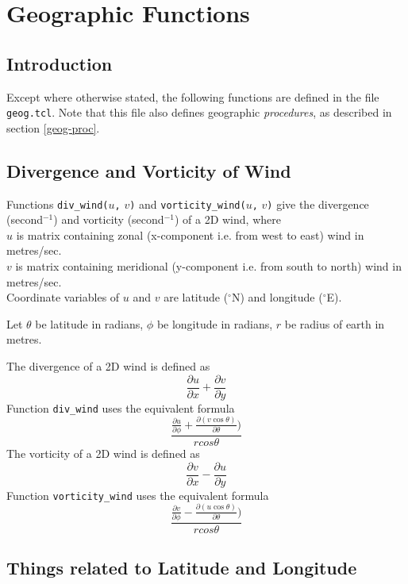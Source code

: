 
\section{Geographic Functions}
    \label{geog}

\subsection{Introduction}
    \label{geog-Introduction}

Except where otherwise stated,
the following functions are defined in the file \texttt{geog.tcl}.
Note that this file also defines 
geographic {\em procedures}, as described in section \ref{geog-proc}.

\subsection{Divergence and Vorticity of Wind}
    \label{geog-Wind}

Functions 
  \texttt{div\_wind(}$u$\texttt{,} $v$\texttt{)}
and 
  \texttt{vorticity\_wind(}$u$\texttt{,} $v$\texttt{)}
give the divergence (second$^{-1}$) and vorticity (second$^{-1}$)
  of a 2D wind, where
  \\
  $u$ is matrix containing zonal (x-component i.e. from west
  to east) wind in metres/sec.
  \\
  $v$ is matrix containing meridional (y-component i.e. from
  south to north) wind in metres/sec.
  \\Coordinate variables of 
  $u$ and 
  $v$ are latitude ($^{\circ}$N) and longitude ($^{\circ}$E).
  
 Let 
  $\theta$ be latitude in radians, 
  $\phi$ be longitude in radians, 
  $r$ be radius of earth in metres.

  The divergence of a 2D wind is defined as
\[
  \frac{\partial u}{\partial x} + \frac{\partial v}{\partial y}
\]
Function \texttt{div\_wind} uses the equivalent formula
\[
  \frac{\frac{\partial u}{\partial \phi} + \frac{\partial(v \cos \theta)}{\partial \theta})}
  {r cos \theta}
\]
  The vorticity of a 2D wind is defined as
\[
  \frac{\partial v}{\partial x} - \frac{\partial u}{\partial y}
\]
  Function 
  \texttt{vorticity\_wind} uses the equivalent formula
\[
  \frac{\frac{\partial v}{\partial \phi} - \frac{\partial(u \cos \theta)}{\partial \theta})}
  {r cos \theta}
\]

\subsection{Things related to Latitude and Longitude}
    \label{geog-latlon}

